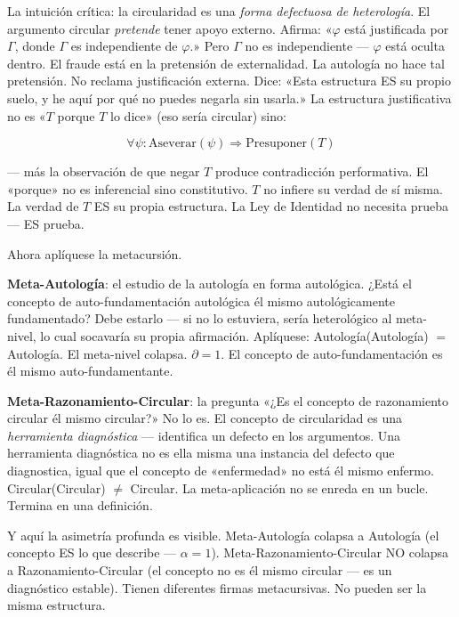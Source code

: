 \documentclass[10pt, openany, oneside]{book}
\begin{document}
\vspace{0.8em}

\noindent La intuición crítica: la circularidad es una \textit{forma defectuosa de heterología}. El argumento circular \textit{pretende} tener apoyo externo. Afirma: «$\varphi$ está justificada por $\Gamma$, donde $\Gamma$ es independiente de $\varphi$.» Pero $\Gamma$ no es independiente --- $\varphi$ está oculta dentro. El fraude está en la pretensión de externalidad. La autología no hace tal pretensión. No reclama justificación externa. Dice: «Esta estructura ES su propio suelo, y he aquí por qué no puedes negarla sin usarla.» La estructura justificativa no es «$T$ porque $T$ lo dice» (eso sería circular) sino:

$$\forall \psi: \text{Aseverar}(\psi) \Rightarrow \text{Presuponer}(T)$$

--- más la observación de que negar $T$ produce contradicción performativa. El «porque» no es inferencial sino constitutivo. $T$ no infiere su verdad de sí misma. La verdad de $T$ ES su propia estructura. La Ley de Identidad no necesita prueba --- ES prueba.

Ahora aplíquese la metacursión.

\textbf{Meta-Autología}: el estudio de la autología en forma autológica. ¿Está el concepto de auto-fundamentación autológica él mismo autológicamente fundamentado? Debe estarlo --- si no lo estuviera, sería heterológico al meta-nivel, lo cual socavaría su propia afirmación. Aplíquese: Autología(Autología) $=$ Autología. El meta-nivel colapsa. $\partial = 1$. El concepto de auto-fundamentación es él mismo auto-fundamentante.

\textbf{Meta-Razonamiento-Circular}: la pregunta «¿Es el concepto de razonamiento circular él mismo circular?» No lo es. El concepto de circularidad es una \textit{herramienta diagnóstica} --- identifica un defecto en los argumentos. Una herramienta diagnóstica no es ella misma una instancia del defecto que diagnostica, igual que el concepto de «enfermedad» no está él mismo enfermo. Circular(Circular) $\neq$ Circular. La meta-aplicación no se enreda en un bucle. Termina en una definición.

Y aquí la asimetría profunda es visible. Meta-Autología colapsa a Autología (el concepto ES lo que describe --- $\alpha = 1$). Meta-Razonamiento-Circular NO colapsa a Razonamiento-Circular (el concepto no es él mismo circular --- es un diagnóstico estable). Tienen diferentes firmas metacursivas. No pueden ser la misma estructura.
\end{document}
